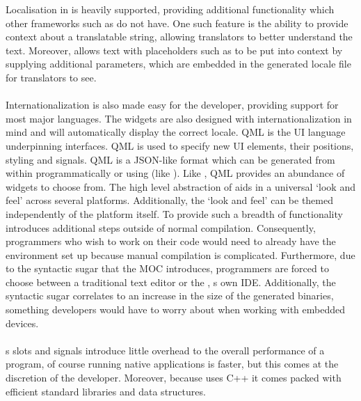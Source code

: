   Localisation in  is heavily supported, providing additional functionality which other frameworks such as  do not have\cite{qt_localisation}. One such feature is the ability to provide context about a translatable string, allowing translators to better understand the text. Moreover,  allows text with placeholders such as  to be put into context by supplying additional parameters, which are embedded in the generated locale file for translators to see. \\\\
  Internationalization is also made easy for the developer, providing support for most major languages\cite{qt_international}. The widgets are also designed with internationalization in mind and will automatically display the correct locale.
  QML is the UI language underpinning  interfaces\cite{qt_qml}. QML is used to specify new UI elements, their positions, styling and signals. QML is a JSON-like format which can be generated from within  programmatically or using  (like ). Like , QML provides an abundance of widgets to choose from. The high level abstraction of  aids in a universal `look and feel' across several platforms. Additionally, the `look and feel' can be themed independently of the platform itself.
  To provide such a breadth of functionality  introduces additional steps outside of normal compilation. Consequently, programmers who wish to work on their code would need to already have the  environment set up because manual compilation is complicated. Furthermore, due to the syntactic sugar that the MOC introduces, programmers are forced to choose between a traditional text editor or the , s own IDE. Additionally,
  the syntactic sugar correlates to an increase in the size of the generated binaries, something developers would have to worry about when working with embedded devices.\\\\
  s slots and signals introduce little overhead to the overall performance of a program, of course running native applications is faster, but this comes at the discretion of the developer. Moreover, because  uses C++ it comes packed with efficient standard libraries and data structures.
